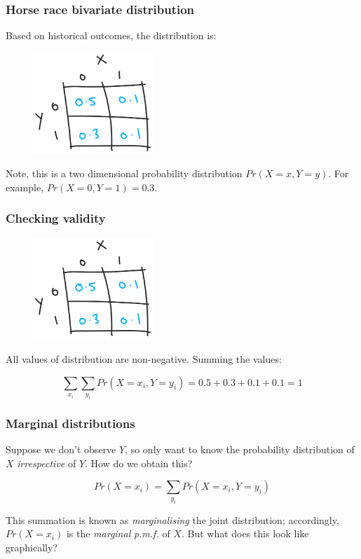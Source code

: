 \documentclass{beamer}
\begin{document}
	\begin{frame}
		\frametitle{Horse race bivariate distribution}
		
		Based on historical outcomes, the distribution is:
		
		\begin{figure}[ht]
			\centerline{\includegraphics[width=0.4\textwidth]{./figures/horse_race_base.pdf}}
		\end{figure}
		
		Note, this is a two dimensional probability distribution $Pr(X=x, Y=y)$. For example, $Pr(X=0, Y=1)=0.3$.
		
	\end{frame}
	
	\begin{frame}
		\frametitle{Checking validity}
		
		\begin{figure}[ht]
			\centerline{\includegraphics[width=0.4\textwidth]{./figures/horse_race_base.pdf}}
		\end{figure}
		
		All values of distribution are non-negative. Summing the values:
		
		\begin{equation}
		\sum_{x_i} \sum_{y_i} Pr(X=x_i, Y=y_i) = 0.5 + 0.3 + 0.1 + 0.1 = 1
		\end{equation}
		
	\end{frame}
	
	\begin{frame}
		\frametitle{Marginal distributions}
		
		Suppose we don't observe $Y$, so only want to know the probability distribution of $X$ \textit{irrespective} of $Y$. How do we obtain this?
		
		\begin{equation}
		Pr(X=x_i) = \sum_{y_i} Pr(X=x_i, Y=y_i)
		\end{equation}
		
		This summation is known as \textit{marginalising} the joint distribution; accordingly, $Pr(X=x_i)$ is the \textit{marginal} \textit{p.m.f.} of $X$. But what does this look like graphically? 
		
	\end{frame}
	
\end{document}
